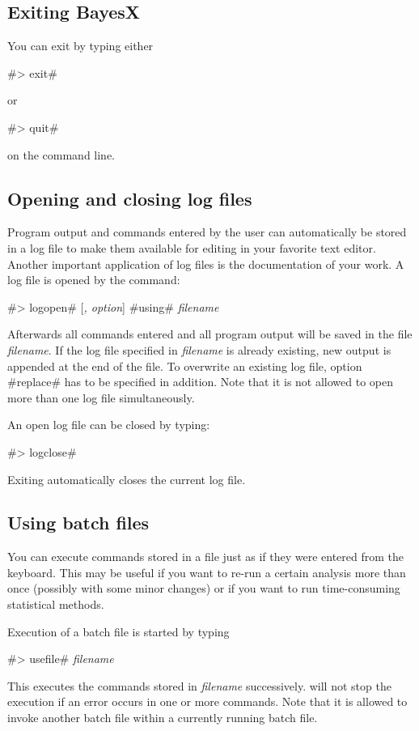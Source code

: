 \subsection{Exiting BayesX}

You can exit \BayesX by typing either

#> exit#

or

#> quit#

on the  command line. 

\subsection{Opening and closing log files} 
 \label{logfile}

Program output and commands entered by the user can automatically be stored in a log file to make them available for editing in your favorite text editor. Another important application of log files is the documentation of your work. A log file is opened by the command:

#> logopen# [{\em, option}] #using# {\em filename}

Afterwards all commands entered and all program output will be saved in the file {\em filename}. If the log file specified in {\em filename} is already existing, new output is appended at the end of the file. To overwrite an existing log file, option #replace# has to be specified in addition. Note that it is not allowed to open more than one log file simultaneously.

An open log file can be closed by typing:

#> logclose#

Exiting \BayesX automatically closes the current log file.

\subsection{Using batch files}
 \label{batch} 

You can execute commands stored in a file just as if they were entered from the keyboard. This may be useful if you want to re-run a certain analysis more than once (possibly with some minor
changes) or if you want to run time-consuming statistical methods.

Execution of a batch file is started by typing

#> usefile# {\em filename}

This executes the commands stored in {\em filename} successively. \BayesX will not stop the execution if an error occurs in one or more commands. Note that it is allowed to invoke another batch
file within a currently running batch file. 


